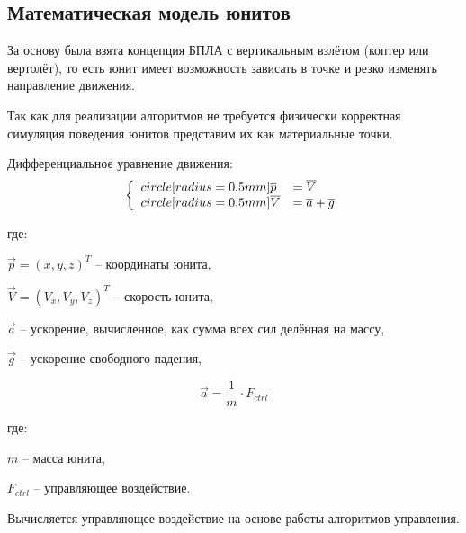 \subsection{Математическая модель юнитов}

За основу была взята концепция БПЛА с вертикальным взлётом (коптер или вертолёт),
то есть юнит имеет возможность зависать в точке и резко изменять направление движения.

Так как для реализации алгоритмов не требуется физически корректная симуляция
поведения юнитов представим их как материальные точки.

Дифференциальное уравнение движения:
$$
\left\{
    \begin{array}{l l}
    \dot{\vec{p}}  & = \vec V \\
    \dot{\vec{V}}  & = \vec a + \vec g
    \end{array}
\right.
$$

где:

$\vec p = (x,y,z)^T$ -- координаты юнита,

$\vec V = (V_x,V_y,V_z)^T$ -- скорость юнита,

$\vec a$ -- ускорение, вычисленное, как сумма всех сил делённая на массу,

$\vec g$ -- ускорение свободного падения,

$$ \vec a = \frac{1}{m} \cdot F_{ctrl} $$

где:

$m$ -- масса юнита,

$F_{ctrl}$ -- управляющее воздействие.

Вычисляется управляющее воздействие на основе работы алгоритмов управления.
